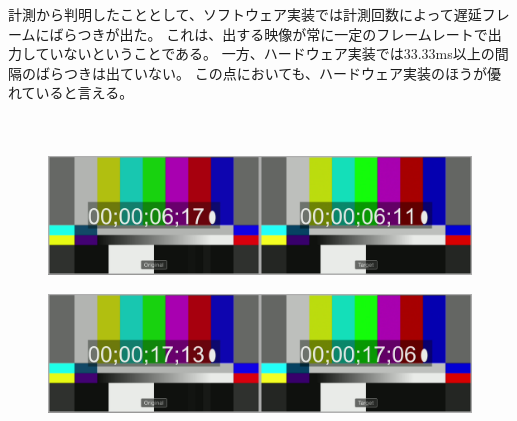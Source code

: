 計測から判明したこととして、ソフトウェア実装では計測回数によって遅延フレームにばらつきが出た。
これは、出する映像が常に一定のフレームレートで出力していないということである。
一方、ハードウェア実装では33.33ms以上の間隔のばらつきは出ていない。
この点においても、ハードウェア実装のほうが優れていると言える。
\\\\\\

\begin{figure}[htbp]
  \begin{center}
    \includegraphics[bb=0 0 1920 540,width=14cm]{img/evaluate-delay-software-1.png}
  \end{center}
  \caption[ソフトウェア実装による1回目の遅延計測のキャプチャー画像]{}
  \label{fig:evaluate-delay-software-1}
\end{figure}

\begin{figure}[htbp]
  \begin{center}
    \includegraphics[bb=0 0 1920 540,width=14cm]{img/evaluate-delay-software-2.png}
  \end{center}
  \caption[ソフトウェア実装による4回目の遅延計測のキャプチャー画像]{}
  \label{fig:evaluate-delay-software-2}
\end{figure}


